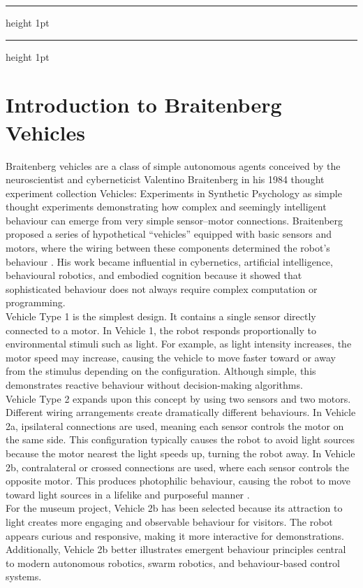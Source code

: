 \documentclass[11 pt , a 4 paper ]{article}
\theoremstyle{definition}
\begin{document}
	\vskip 7pt
	{\color{aqua}\hrule height 1pt}
	{\color{grey}\hrule height 1pt}
	
	\vskip 5pt

  \section*{Introduction to Braitenberg Vehicles}
  Braitenberg vehicles are a class of simple autonomous agents conceived by the neuroscientist and cyberneticist Valentino Braitenberg in his 1984 thought experiment collection Vehicles: Experiments in Synthetic Psychology as simple thought experiments demonstrating how complex and seemingly intelligent behaviour can emerge from very simple sensor–motor connections. Braitenberg proposed a series of hypothetical “vehicles” equipped with basic sensors and motors, where the wiring between these components determined the robot’s behaviour \cite{braitenberg1984}. His work became influential in cybernetics, artificial intelligence, behavioural robotics, and embodied cognition because it showed that sophisticated behaviour does not always require complex computation or programming.\\

\noindent Vehicle Type 1 is the simplest design. It contains a single sensor directly connected to a motor. In Vehicle 1, the robot responds proportionally to environmental stimuli such as light. For example, as light intensity increases, the motor speed may increase, causing the vehicle to move faster toward or away from the stimulus depending on the configuration. Although simple, this demonstrates reactive behaviour without decision-making algorithms.\\

\noindent Vehicle Type 2 expands upon this concept by using two sensors and two motors. Different wiring arrangements create dramatically different behaviours. In Vehicle 2a, ipsilateral connections are used, meaning each sensor controls the motor on the same side. This configuration typically causes the robot to avoid light sources because the motor nearest the light speeds up, turning the robot away. In Vehicle 2b, contralateral or crossed connections are used, where each sensor controls the opposite motor. This produces photophilic behaviour, causing the robot to move toward light sources in a lifelike and purposeful manner \cite{wikibraitenberg}.\\

\noindent For the museum project, Vehicle 2b has been selected because its attraction to light creates more engaging and observable behaviour for visitors. The robot appears curious and responsive, making it more interactive for demonstrations. Additionally, Vehicle 2b better illustrates emergent behaviour principles central to modern autonomous robotics, swarm robotics, and behaviour-based control systems.
\end{document}
